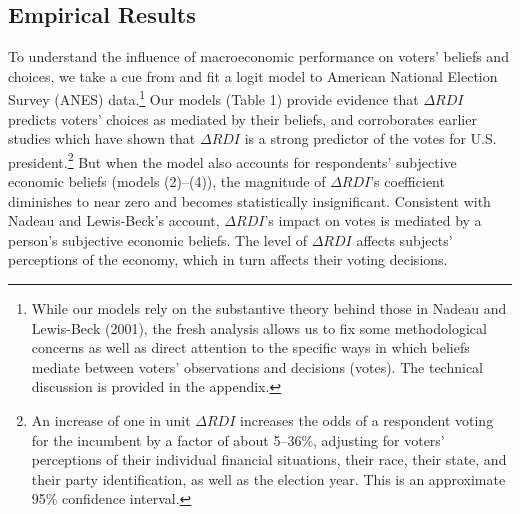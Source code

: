 \documentclass[11pt]{article}
\begin{document}
\subsection{Empirical Results}\label{sec:model}
To understand the influence of macroeconomic performance on voters' beliefs and choices, we take a cue from \citet{Nadeau:2001tw} and fit a logit model to American National Election Survey (ANES) data.\footnote{While
our models rely on the substantive theory behind those in Nadeau and Lewis-Beck (2001), the fresh analysis allows us to fix some methodological concerns as well as direct attention to the specific ways in which beliefs mediate between voters' observations and decisions (votes). The technical discussion is provided in the appendix.} Our models (Table 1) provide evidence that $\Delta RDI$ predicts voters' choices as mediated by their beliefs, and corroborates earlier studies which have shown that $\Delta RDI$  is a strong predictor of the votes for U.S. president.\footnote{An increase of one in unit $\Delta RDI$ increases the odds of a respondent voting for the incumbent by a factor of about 5--36\%, adjusting for voters' perceptions of their individual financial situations, their race, their state, and their party identification, as well as the election year. This is an approximate 95\% confidence interval.}%
But when the model also accounts for respondents' subjective  economic beliefs (models (2)--(4)), the magnitude of $\Delta RDI$'s coefficient diminishes to near zero and becomes statistically insignificant. Consistent with Nadeau and Lewis-Beck's account, $\Delta RDI$'s impact on votes is mediated by a person's subjective economic beliefs. The level of $\Delta RDI$ affects subjects' perceptions of the economy, which in turn affects their voting decisions. %
\end{document}
